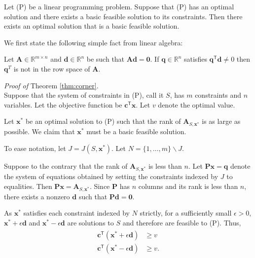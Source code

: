 \documentclass[]{book}
\def\gt{>}
\newcommand{\RR}{\mathbb{R}}
\newcommand{\T}{\mathsf{T}}
\newcommand{\mm}[1]{\mathbf{#1}}
\renewcommand{\vec}[1]{\mathbf{#1}}
\theoremstyle{definition}
\theoremstyle{definition}
\theoremstyle{remark}
\let\BeginKnitrBlock\begin \let\EndKnitrBlock\end
\begin{document}
\BeginKnitrBlock{theorem}
\protect\hypertarget{thm:corner}{}{\label{thm:corner}}Let (P) be a linear
programming problem. Suppose that (P) has an optimal solution and there
exists a basic feasible solution to its constraints. Then there exists
an optimal solution that is a basic feasible solution.
\EndKnitrBlock{theorem}

We first state the following simple fact from linear algebra:

\BeginKnitrBlock{lemma}
\protect\hypertarget{lem:orth-rank}{}{\label{lem:orth-rank}}Let
\(\mm{A} \in \RR^{m\times n}\) and \(\vec{d} \in \RR^n\) be such that
\(\mm{A} \vec{d} = \vec{0}\). If \(\vec{q}\in\RR^n\) satisfies
\(\vec{q}^\T \vec{d} \neq 0\) then \(\vec{q}^T\) is not in the row space
of \(\mm{A}\).
\EndKnitrBlock{lemma}

\emph{Proof of} Theorem \ref{thm:corner}.\\
Suppose that the system of constraints in (P), call it \(S\), has \(m\)
constraints and \(n\) variables. Let the objective function be
\(\vec{c}^\T \vec{x}\). Let \(v\) denote the optimal value.

Let \(\vec{x}^*\) be an optimal solution to (P) such that the rank of
\(\mm{A}_{S,\vec{x}^*}\) is as large as possible. We claim that
\(\vec{x}^*\) must be a basic feasible solution.

To ease notation, let \(J = J(S,\vec{x}^*)\). Let
\(N = \{1,\ldots,m\} \backslash J\).

Suppose to the contrary that the rank of \(\mm{A}_{S,\vec{x}^*}\) is
less than \(n\). Let \(\mm{P}\vec{x} = \vec{q}\) denote the system of
equations obtained by setting the constraints indexed by \(J\) to
equalities. Then \(\mm{P}\vec{x} = \mm{A}_{S,\vec{x}^*}\). Since
\(\mm{P}\) has \(n\) columns and its rank is less than \(n\), there
exists a nonzero \(\vec{d}\) such that \(\mm{P} \vec{d} = \vec{0}\).

As \(\vec{x}^*\) satisfies each constraint indexed by \(N\) strictly,
for a sufficiently small \(\epsilon \gt 0\),
\(\vec{x}^* + \epsilon \vec{d}\) and \(\vec{x}^* - \epsilon \vec{d}\)
are solutions to \(S\) and therefore are feasible to (P). Thus,
\begin{align}
\begin{split}
\vec{c}^\T (\vec{x}^* + \epsilon \vec{d}) & \geq v \\
\vec{c}^\T (\vec{x}^* - \epsilon \vec{d}) & \geq v.
\end{split}\label{eq:twoway}
\end{align}
\end{document}
